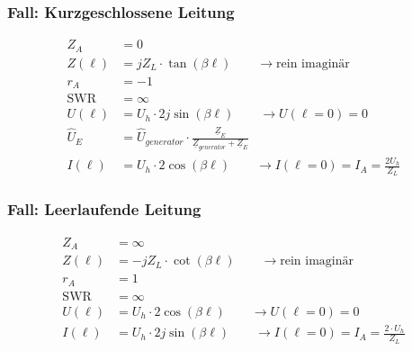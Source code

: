 \subsubsection{Fall: Kurzgeschlossene Leitung}
\begin{align*}
    Z_A          & = 0                                                                                         \\
    Z(\ell)         & = j Z_L\cdot\tan(\beta \ell)        \qquad\rightarrow\text{rein imaginär}                      \\
    r_A          & = -1                                                                                        \\
    \mathrm{SWR} & = \infty                                                                                    \\
    U(\ell)         & = U_h\cdot 2j\sin(\beta \ell)    \qquad\rightarrow U(\ell=0)=0                                    \\
    \hat{U}_E    & = \hat{U}_{generator}\cdot\frac{\underline{Z}_E}{\underline{Z}_{generator}+\underline{Z}_E} \\
    I(\ell)         & = U_h\cdot 2\cos(\beta \ell)    \qquad\rightarrow I(\ell=0)=I_A=\frac{2U_h}{Z_L}
\end{align*}

\subsubsection{Fall: Leerlaufende Leitung}
\begin{align*}
    Z_A          & = \infty                                                                         \\
    Z(\ell)         & = -jZ_L\cdot \cot(\beta \ell) \qquad\rightarrow\text{rein imaginär}                 \\
    r_A          & = 1                                                                              \\
    \mathrm{SWR} & = \infty                                                                         \\
    U(\ell)         & = U_h\cdot 2\cos(\beta \ell) \qquad\rightarrow U(\ell=0)=0                             \\
    I(\ell)         & = U_h\cdot 2j\sin(\beta \ell) \qquad\rightarrow I(\ell=0)=I_A = \frac{2\cdot U_h}{Z_L}
\end{align*}

